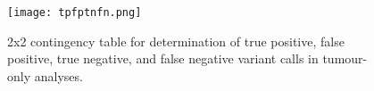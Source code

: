 
\begin{figure}[H]
\centering
	\texttt{[image: tpfptnfn.png]}
	\caption{2x2 contingency table for determination of true positive, false positive, true negative, and false negative variant calls in tumour-only analyses.}
	\label{fig:tpfptnfn}
\end{figure}



\endinput
